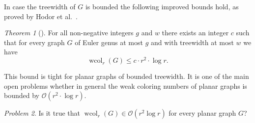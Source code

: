 \documentclass[1p,number,a4paper]{elsarticle}
\theoremstyle{remark}
\newcommand{\Oof}{\mathcal{O}}
\DeclareMathOperator{\wcol}{wcol}
\newtheorem{theorem}{Theorem}[section]
\newtheorem{problem}[theorem]{Problem}
\begin{document}
%


In case the treewidth of $G$ is bounded the following improved bounds hold, as proved by Hodor et al.~\cite{hodor2024weak}. 

\begin{theorem}[\cite{hodor2024weak}]
    For all non-negative integers $g$ and $w$ there exists an integer $c$ such that for every graph $G$ of Euler genus at most $g$ and with treewidth at most $w$ we have \[\wcol_r(G)\leq c\cdot r^2\cdot\log r.\]
\end{theorem}

This bound is tight for planar graphs of bounded treewidth. It is one of the main open problems whether in general the weak coloring numbers of planar graphs is bounded by $\Oof(r^2\cdot \log r)$. 

\begin{problem}
    Is it true that $\wcol_r(G)\in \Oof(r^2\log r)$ for every planar graph $G$?
\end{problem}
\end{document}
